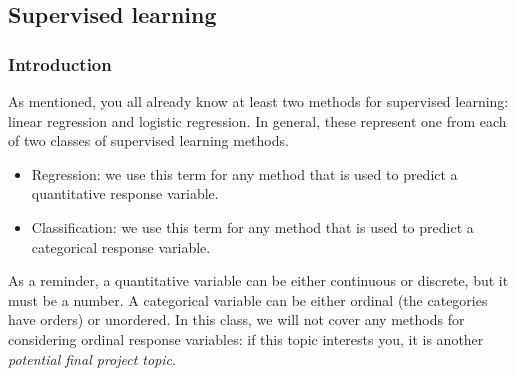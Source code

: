 \subsection{Supervised learning}

\subsubsection{Introduction}

As mentioned, you all already know at least two methods for supervised learning: linear regression and logistic regression. In general, these represent one from each of two classes of supervised learning methods.
\begin{itemize}
\item Regression: we use this term for any method that is used to predict a quantitative response variable.
\item Classification: we use this term for any method that is used to predict a categorical response variable. 
\end{itemize}
As a reminder, a quantitative variable can be either continuous or discrete, but it must be a number. A categorical variable can be either ordinal (the categories have orders) or unordered. In this class, we will not cover any methods for considering ordinal response variables: if this topic interests you, it is another \emph{potential final project topic}. 

